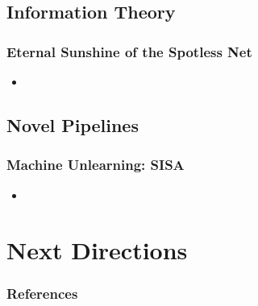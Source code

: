 \documentclass[pdf]{beamer}
\begin{document}
\subsection{Information Theory}
\begin{frame}
  \myNset[3]
  \smartart
\end{frame}

\begin{frame}
  \frametitle{
    Eternal Sunshine of the Spotless Net \cite{golatkarEternalSunshineSpotless2020}
    }
  \begin{itemize}
    \item 
  \end{itemize}
\end{frame}

\subsection{Novel Pipelines}
\begin{frame}
  \myNset[4]
  \smartart
\end{frame}


\begin{frame}
  \frametitle{
    Machine Unlearning: SISA \cite{bourtouleMachineUnlearning2020}
    }
  \begin{itemize}
    \item 
  \end{itemize}
\end{frame}

\section{Next Directions}



\begin{frame}[allowframebreaks]
  \frametitle{References}
  
  
\end{frame}
\end{document}
